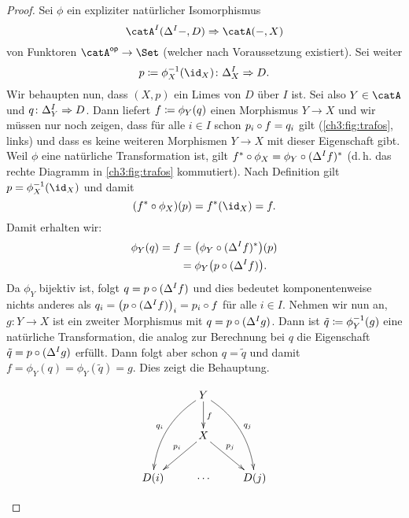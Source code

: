 \begin{proof}
    Sei $\phi$ ein expliziter natürlicher Isomorphismus
    \[ \catA^I(\Delta^I\blank, D) \nattrafoto \catA(\blank, X)  \]
    von Funktoren $\catA\op\to\Set$ (welcher nach Voraussetzung existiert).
    Sei weiter 
    \[ p \defeq \phi_X^{-1}(\id_X)\colon \Delta^I_X\nattrafoto D  . \]
    Wir behaupten nun, dass $(X,p)$ ein Limes von $D$ über $I$ ist. Sei also
    $Y\in\catA$ und $q\colon\Delta^I_Y\mathrel{\Rightarrow} D$. Dann liefert 
    $f \coloneqq \phi_Y(q)$ einen Morphismus $Y\to X$ und wir müssen nur noch
    zeigen, dass für alle $i\in I$ schon $p_i\after f = q_i$ gilt
    (\cref{ch3:fig:trafos}, links) und dass es keine weiteren Mor\-phi\-smen
    $Y\to X$ mit dieser Eigenschaft gibt. Weil $\phi$ eine natürliche
    Transformation ist, gilt $f^*\after \phi_X = \phi_Y \after (\Delta^I f)^*$
    (d.\,h. das rechte Diagramm in \cref{ch3:fig:trafos} kommutiert).
    Nach Definition gilt $p = \phi_X^{-1}(\id_X)$ und damit
    \[ (f^*\after \phi_X)(p) = f^*(\id_X) = f  . \]
    Damit erhalten wir:
    \begin{align*}
        \phi_Y(q) = f
        &= \bigl( \phi_Y \after (\Delta^I f)^* \bigr)(p)    \\
        &= \phi_Y\bigl( p\after (\Delta^I f) \bigr)
    . \end{align*}
    Da $\phi_Y$ bijektiv ist, folgt $q = p \after (\Delta^I f)$ und dies
    bedeutet komponentenweise nichts anderes als 
    $q_i = \bigl( p \after (\Delta^I f) \bigr)_i = p_i \after f$
    für alle $i\in I$. Nehmen wir nun an, $g\colon Y\to X$ ist ein zweiter
    Morphismus mit $q = p\after (\Delta^I g)$. Dann ist $\tilde q\coloneqq
    \phi_Y^{-1}(g)$ eine natürliche Transformation, die analog zur Berechnung
    bei $q$ die Eigenschaft $\tilde q = p \after (\Delta^I g)$ erfüllt. Dann
    folgt aber schon $q = \tilde q$ und damit $f = \phi_Y(q) = 
    \phi_Y(\tilde q) = g$. Dies zeigt die Behauptung.
    \\
    \begin{figure}[b]
        \centering
        \begin{equation*}
            \begin{gathered}
                \xymatrix{
                    & \ar@/_1pc/[ddl]_{q_i} Y \ar@/^1pc/[ddr]^{q_j} 
                    \ar[d]^f &
                    \\
                    & \ar[dl]_(.4){p_i} X \ar[dr]^(.4){p_j} &
                    \\
                    D(i) & \cdots & D(j)
                }

\end{gathered}
\end{equation*}
\end{figure}
\end{proof}
